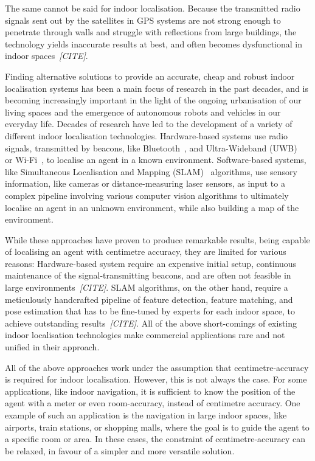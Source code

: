 \documentclass[a4paper]{article}
\begin{document}
  The same cannot be said for indoor localisation. Because the transmitted radio
  signals sent out by the satellites in GPS systems are not strong enough to
  penetrate through walls and struggle with reflections from large buildings,
  the technology yields inaccurate results at best, and often becomes
  dysfunctional in indoor spaces~\textit{[CITE]}.

  Finding alternative solutions to provide an accurate, cheap and robust indoor
  localisation systems has been a main focus of research in the past decades,
  and is becoming increasingly important in the light of the ongoing
  urbanisation of our living spaces and the emergence of autonomous robots and
  vehicles in our everyday life. Decades of research have led to the development
  of a variety of different indoor localisation technologies. Hardware-based
  systems use radio signals, transmitted by beacons, like
  Bluetooth~\cite{bluetooth1, bluetooth2}, and Ultra-Wideband (UWB)~\cite{uwb1,
  uwb2} or Wi-Fi~\cite{survey1, survey2, wireless-positioning}, to localise an
  agent in a known environment. Software-based systems, like Simultaneous
  Localisation and Mapping (SLAM)~\cite{mono-slam, ptam, orb-slam} algorithms,
  use sensory information, like cameras or distance-measuring laser sensors, as
  input to a complex pipeline involving various computer vision algorithms to
  ultimately localise an agent in an unknown environment, while also building a
  map of the environment.
  
  While these approaches have proven to produce remarkable results, being
  capable of localising an agent with centimetre accuracy, they are limited for
  various reasons: Hardware-based system require an expensive initial setup,
  continuous maintenance of the signal-transmitting beacons, and are often not
  feasible in large environments~\textit{[CITE]}. SLAM algorithms, on the other
  hand, require a meticulously handcrafted pipeline of feature detection,
  feature matching, and pose estimation that has to be fine-tuned by experts for
  each indoor space, to achieve outstanding results~\textit{[CITE]}. All of the
  above short-comings of existing indoor localisation technologies make
  commercial applications rare and not unified in their approach. 

  All of the above approaches work under the assumption that centimetre-accuracy
  is required for indoor localisation. However, this is not always the case. For
  some applications, like indoor navigation, it is sufficient to know the
  position of the agent with a meter or even room-accuracy, instead of
  centimetre accuracy. One example of such an application is the navigation in
  large indoor spaces, like airports, train stations, or shopping malls, where
  the goal is to guide the agent to a specific room or area. In these cases, the
  constraint of centimetre-accuracy can be relaxed, in favour of a simpler and
  more versatile solution.
\end{document}
